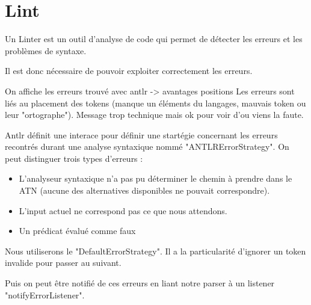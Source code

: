 \documentclass[
    iict, %
    il, %
]{heig-tb}
\begin{document}



\section{Lint}
Un Linter est un outil d'analyse de code qui permet de détecter les erreurs et les problèmes de syntaxe.

Il est donc nécessaire de pouvoir exploiter correctement les erreurs.


On affiche les erreurs trouvé avec antlr -> avantages positions
Les erreurs sont liés au placement des tokens (manque un éléments du langages, mauvais token ou leur "ortographe").
Message trop technique mais ok pour voir d'ou viens la faute.

Antlr définit une interace pour définir une startégie concernant les erreurs recontrés durant une analyse syntaxique nommé "ANTLRErrorStrategy".
On peut distinguer trois types d'erreurs :
\begin{itemize}
    \item L'analyseur syntaxique n'a pas pu déterminer le chemin à prendre dans le ATN (aucune des alternatives disponibles ne pouvait correspondre).
    \item L'input actuel ne correspond pas ce que nous attendons.
    \item Un prédicat évalué comme faux
\end{itemize}

Nous utiliserons le "DefaultErrorStrategy". Il a la particularité d'ignorer un token invalide pour passer au suivant.

Puis on peut être notifié de ces erreurs en liant notre parser à un listener "notifyErrorListener".


\end{document}
